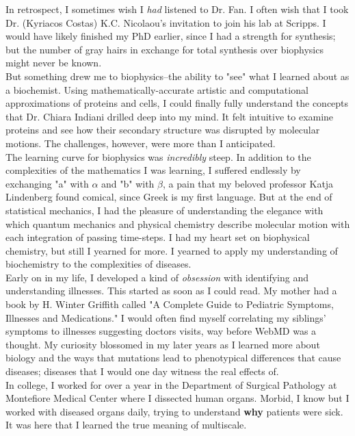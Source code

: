 \documentclass[12pt]{ucsddissertation}
\newcommand\tab[1][1cm]{\hspace*{#1}}
\begin{document}
\begin{preface}
\tab[0.7cm]In retrospect, I  sometimes wish I \textit{had} listened to Dr. Fan. I often wish that I took Dr. (Kyriacos Costas) K.C. Nicolaou's invitation to join his lab at Scripps. I would have likely finished my PhD earlier, since I had a strength for synthesis; but the number of gray hairs in exchange for total synthesis over biophysics might never be known. \\
\tab[0.7cm] But something drew me to biophysics--the ability to "see" what I learned about as a biochemist. Using mathematically-accurate artistic and computational approximations of proteins and cells, I could finally fully understand the concepts that Dr. Chiara Indiani drilled deep into my mind. It felt intuitive to examine proteins and see how their secondary structure was disrupted by molecular motions. The challenges, however, were more than I anticipated.\\
\tab[0.7cm]The learning curve for biophysics was \textit{incredibly} steep. In addition to the complexities of the mathematics I was learning, I suffered endlessly by exchanging "a" with $\alpha$ and "b" with $\beta$, a pain that my beloved professor Katja Lindenberg found comical, since Greek is my first language. But at the end of statistical mechanics, I had the pleasure of understanding the elegance with which quantum mechanics and physical chemistry describe molecular motion with each integration of passing time-steps. I had my heart set on biophysical chemistry, but still I yearned for more. I yearned to apply my understanding of biochemistry to the complexities of diseases.\\
\tab[0.7cm]Early on in my life, I developed a kind of \textit{obsession} with identifying and understanding illnesses. This started as soon as I could read. My mother had a book by H. Winter Griffith called "A Complete Guide to Pediatric Symptoms, Illnesses and Medications." I would often find myself correlating  my siblings' symptoms to illnesses suggesting doctors visits, way before WebMD was a thought. My curiosity blossomed in my later years as I learned more about biology and the ways that mutations lead to phenotypical differences that cause diseases; diseases that I would one day witness the real effects of.\\
\tab[0.7cm]In college, I worked for over a year in the Department of Surgical Pathology at Montefiore Medical Center where I dissected human organs. Morbid, I know but I worked with diseased organs daily, trying to understand \textbf{why} patients were sick. It was here that I learned the true meaning of multiscale. 



\end{preface}
\end{document}
